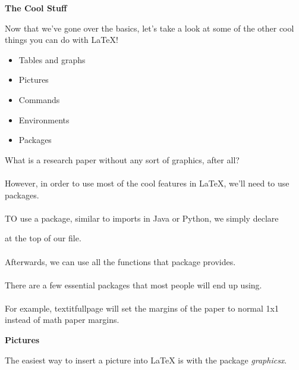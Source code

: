 \documentclass[a4paper,12pt]{article}
\begin{document}
\newpage
\begin{center}
	\bf{\Huge{The Cool Stuff}}
\end{center}
\bigskip
\Large
Now that we've gone over the basics, let's take a look at some of the other cool things you can do with LaTeX!
\begin{itemize}
	\item Tables and graphs
	\item Pictures
	\item Commands
	\item Environments
	\item Packages
\end{itemize}
\medskip
\large
What is a research paper without any sort of graphics, after all? \\\\
However, in order to use most of the cool features in LaTeX, we'll need to use packages. \\\\
TO use a package, similar to imports in Java or Python, we simply declare \usepackage{packagename} at the top of our file. \\\\
Afterwards, we can use all the functions that package provides. \\\\
There are a few essential packages that most people will end up using. \\\\
For example, textit{fullpage} will set the margins of the paper to normal 1x1 instead of math paper margins.

\newpage
\begin{center}
  \bf{\Huge{Pictures}}
\end{center}
\bigskip
\Large
The easiest way to insert a picture into LaTeX is with the package \textit{graphicsx}. \\\\
\large
\end{document}
